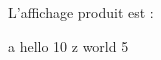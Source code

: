 L'affichage produit est :

\begin{galgascode}
a hello 10
z world 5
\end{galgascode}

%
%
%
%
%
%
%
%
%
%
%
%
%
%
%
%
%
%
%
%
%
%
%
%
%
